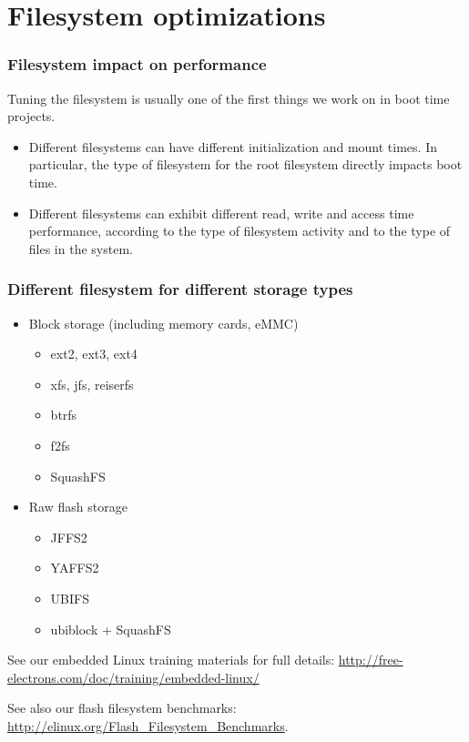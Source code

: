\section{Filesystem optimizations}

\begin{frame}
\frametitle{Filesystem impact on performance}
Tuning the filesystem is usually one of the first things
we work on in boot time projects.
\begin{itemize}
\item Different filesystems can have different initialization
      and mount times. In particular, the type of filesystem
      for the root filesystem directly impacts boot time.
\item Different filesystems can exhibit different read, write
      and access time performance, according to the type 
      of filesystem activity and to the type of files in the
      system. 
\end{itemize}
\end{frame}

\begin{frame}
\frametitle{Different filesystem for different storage types}
\begin{itemize}
\item Block storage (including memory cards, eMMC)
      \begin{itemize}
      \item ext2, ext3, ext4
      \item xfs, jfs, reiserfs 
      \item btrfs
      \item f2fs
      \item SquashFS
      \end{itemize}
\item Raw flash storage
      \begin{itemize}
      \item JFFS2
      \item YAFFS2
      \item UBIFS
      \item ubiblock + SquashFS
      \end{itemize}
\end{itemize}
See our embedded Linux training materials for full details:
{\small
\url{http://free-electrons.com/doc/training/embedded-linux/}
}

See also our flash filesystem benchmarks:
{\small
\url{http://elinux.org/Flash_Filesystem_Benchmarks}.
}
\end{frame}

